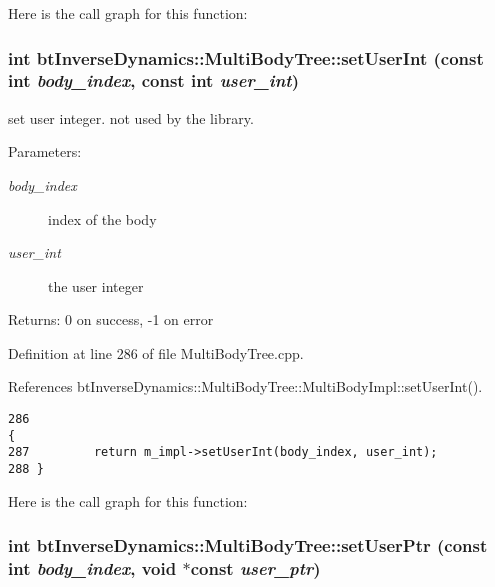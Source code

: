 Here is the call graph for this function:\hypertarget{classbt_inverse_dynamics_1_1_multi_body_tree_f93f698a6d22d8f735f162c326649342}{
\subsubsection[setUserInt]{\setlength{\rightskip}{0pt plus 5cm}int btInverseDynamics::MultiBodyTree::setUserInt (const int {\em body\_\-index}, \/  const int {\em user\_\-int})}}
\label{classbt_inverse_dynamics_1_1_multi_body_tree_f93f698a6d22d8f735f162c326649342}


set user integer. not used by the library. \begin{Desc}
\item[Parameters:]
\begin{description}
\item[{\em body\_\-index}]index of the body \item[{\em user\_\-int}]the user integer \end{description}
\end{Desc}
\begin{Desc}
\item[Returns:]0 on success, -1 on error \end{Desc}


Definition at line 286 of file MultiBodyTree.cpp.

References btInverseDynamics::MultiBodyTree::MultiBodyImpl::setUserInt().

\begin{Code}\begin{verbatim}286                                                                       {
287         return m_impl->setUserInt(body_index, user_int);
288 }
\end{verbatim}
\end{Code}




Here is the call graph for this function:\hypertarget{classbt_inverse_dynamics_1_1_multi_body_tree_d2c37fb7a6cb73b1af87e0b7884717c0}{
\subsubsection[setUserPtr]{\setlength{\rightskip}{0pt plus 5cm}int btInverseDynamics::MultiBodyTree::setUserPtr (const int {\em body\_\-index}, \/  void $\ast$const  {\em user\_\-ptr})}}
\label{classbt_inverse_dynamics_1_1_multi_body_tree_d2c37fb7a6cb73b1af87e0b7884717c0}


